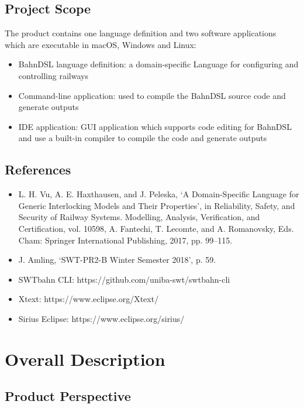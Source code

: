 \documentclass[a4paper,11pt]{scrreprt}
\begin{document}
\section{Project Scope}
The product contains one language definition and two software applications which are executable in macOS, Windows and Linux:
\begin{itemize}
    \item BahnDSL language definition: a domain-specific Language for configuring and controlling railways
    \item Command-line application: used to compile the BahnDSL source code and generate outputs
    \item IDE application: GUI application which supports code editing for BahnDSL and use a built-in compiler to compile the code and generate outputs
\end{itemize} 

\section{References}

\begin{itemize}
    \item L. H. Vu, A. E. Haxthausen, and J. Peleska, ‘A Domain-Specific Language for Generic Interlocking Models and Their Properties’, in Reliability, Safety, and Security of Railway Systems. Modelling, Analysis, Verification, and Certification, vol. 10598, A. Fantechi, T. Lecomte, and A. Romanovsky, Eds. Cham: Springer International Publishing, 2017, pp. 99–115.
    \item J. Amling, ‘SWT-PR2-B Winter Semester 2018’, p. 59.
    \item SWTbahn CLI: https://github.com/uniba-swt/swtbahn-cli
    \item Xtext: https://www.eclipse.org/Xtext/
    \item Sirius Eclipse: https://www.eclipse.org/sirius/
\end{itemize}

\chapter{Overall Description}

\section{Product Perspective}
\end{document}
